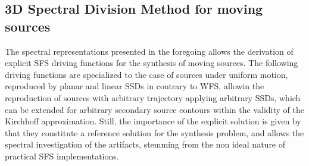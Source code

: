 \subsection{3D Spectral Division Method for moving sources}
The spectral representations presented in the foregoing allows the derivation of explicit SFS driving functions for the synthesis of moving sources.
The following driving functions are specialized to the case of sources under uniform motion, reproduced by planar and linear SSDs in contrary to WFS, allowin the reproduction of sources with arbitrary trajectory applying arbitrary SSDs, which can be extended for arbitrary secondary source contours within the validity of the Kirchhoff approximation.
Still, the importance of the explicit solution is given by that they constitute a reference solution for the synthesis problem, and allows the spectral investigation of the artifacts, stemming from the non ideal nature of practical SFS implementations.

